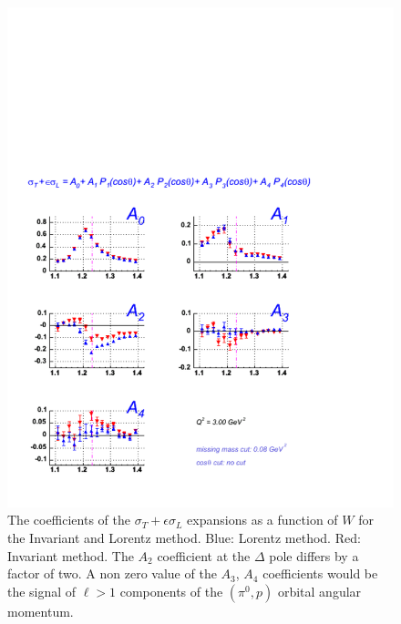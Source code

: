 \begin{figure}[h]
 \begin{center}
  \includegraphics[width = 12cm, bb = 0 20 480 540]{systematics/img/A_coeff_q23.00_mm0.080_ct100.00_L2}
  \caption{The coefficients of the $\sigma_T + \epsilon\sigma_L$ expansions as a function of $W$ 
           for the Invariant and Lorentz method.
           Blue: Lorentz method. Red: Invariant method. The $A_2$ coefficient at the $\Delta$ pole
           differs by a factor of two. A non zero value of the $A_3$, $A_4$ coefficients would be the signal of 
            $\ell>1$ components of the $(\pi^0,p)$ orbital angular momentum.}
  \label{fig:cmthetaacoeff}
 \end{center}
\end{figure} 
